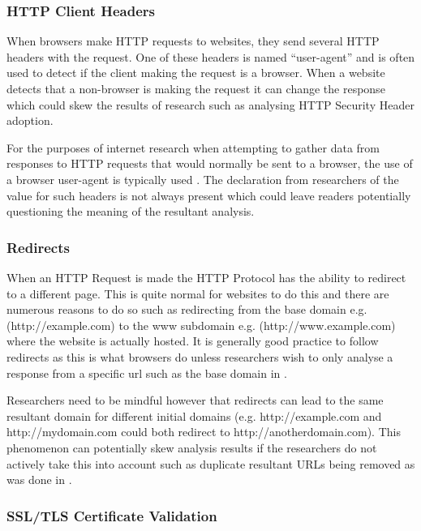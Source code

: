 \documentclass{mscreport}
\begin{document}
\subsubsection{HTTP Client Headers}

When browsers make HTTP requests to websites, they send several HTTP headers with the request. One of these headers is named “user-agent” and is often used to detect if the client making the request is a browser. When a website detects that a non-browser is making the request it can change the response which could skew the results of research such as analysing HTTP Security Header adoption.

\vspace{0.3cm} \noindent
For the purposes of internet research when attempting to gather data from responses to HTTP requests that would normally be sent to a browser, the use of a browser user-agent is typically used \cite{Buchanan2018-xz, Patil2017-bg,Ying2016-ag,Lavrenovs2018-dl,Poteat2021-zr}. The declaration from researchers of the value for such headers is not always present \cite{Amann2017-co} which could leave readers potentially questioning the meaning of the resultant analysis.

\subsubsection{Redirects}

When an HTTP Request is made the HTTP Protocol has the ability to redirect to a different page. This is quite normal for websites to do this and there are numerous reasons to do so such as redirecting from the base domain e.g. (http://example.com) to the www subdomain e.g. (http://www.example.com) where the website is actually hosted. It is generally good practice to follow redirects as this is what browsers do unless researchers wish to only analyse a response from a specific url such as the base domain in \cite{Amann2017-co}.

\vspace{0.3cm} \noindent
Researchers need to be mindful however that redirects can lead to the same resultant domain for different initial domains (e.g. http://example.com and http://mydomain.com could both redirect to http://anotherdomain.com). This phenomenon can potentially skew analysis results if the researchers do not actively take this into account such as duplicate resultant URLs being removed as was done in \cite{Lavrenovs2018-dl}.

\subsubsection{SSL/TLS Certificate Validation}
\end{document}
